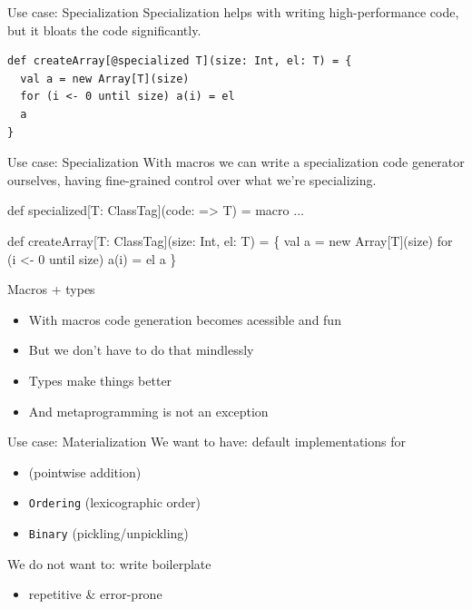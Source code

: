 \documentclass{beamer}
\begin{document}
\begin{frame}[fragile]{Use case: Specialization}
  Specialization helps with writing high-performance code,
  but it bloats the code significantly.

  \vspace{1em}
  \begin{verbatim}
def createArray[@specialized T](size: Int, el: T) = {
  val a = new Array[T](size)
  for (i <- 0 until size) a(i) = el
  a
}
  \end{verbatim}
\end{frame}

\begin{frame}[fragile]{Use case: Specialization}
  With macros we can write a specialization code generator ourselves,
  having fine-grained control over what we're specializing.

  \vspace{1em}
  \begin{semiverbatim}
def specialized[T: ClassTag](code: => T) = macro ...

def createArray[T: ClassTag](size: Int, el: T) = \{
  val a = new Array[T](size)
    for (i <- 0 until size) a(i) = el
  \text{\color{blue}{\}}}
  a
\}
  \end{semiverbatim}
\end{frame}

\begin{frame}{Macros + types}
  \begin{itemize}
  \item With macros code generation becomes acessible and fun
  \item But we don't have to do that mindlessly
  \item Types make things better
  \item And metaprogramming is not an exception
  \end{itemize}
\end{frame}

\begin{frame}{Use case: Materialization}
  We want to have: default implementations for
  \begin{itemize}
    \item \texttt{\color{red}{Semigroup}} (pointwise addition)
    \item \texttt{Ordering} (lexicographic order)
    \item \texttt{Binary} (pickling/unpickling)
  \end{itemize}

  \vspace{1em}
  We do not want to: write boilerplate
  \begin{itemize}
    \item repetitive \& error-prone
  \end{itemize}
\end{frame}
\end{document}
